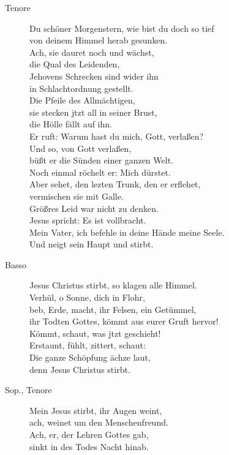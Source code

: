 \documentclass[parskip=full]{scrreprt}
\begin{document}
\begin{description}
  \item[Tenore]
  Du schöner Morgenstern, wie bist du doch so tief\\
  von deinem Himmel herab gesunken.\\
  Ach, sie dauret noch und wächst,\\
  die Qual des Leidenden,\\
  Jehovens Schrecken sind wider ihn\\
  in Schlachtordnung gestellt.\\
  Die Pfeile des Allmächtigen,\\
  sie stecken jtzt all in seiner Brust,\\
  die Hölle fällt auf ihn.\\
  Er ruft: Warum hast du mich, Gott, verlaßen?\\
  Und so, von Gott verlaßen,\\
  büßt er die Sünden einer ganzen Welt.\\
  Noch einmal röchelt er: Mich dürstet.\\
  Aber sehet, den lezten Trunk, den er erflehet,\\
  vermischen sie mit Galle.\\
  Größres Leid war nicht zu denken.\\
  Jesus spricht: Es ist vollbracht.\\
  Mein Vater, ich befehle in deine Hände meine Seele.\\
  Und neigt sein Haupt und stirbt.

  \item[Basso]
  Jesus Christus stirbt, so klagen alle Himmel.\\
  Verhül, o Sonne, dich in Flohr,\\
  beb, Erde, macht, ihr Felsen, ein Getümmel,\\
  ihr Todten Gottes, kömmt aus eurer Gruft hervor!\\
  Kömmt, schaut, was jtzt geschieht!\\
  Erstaunt, fühlt, zittert, schaut:\\
  Die ganze Schöpfung ächze laut,\\
  denn Jesus Christus stirbt.

  \item[Sop., Tenore]
  Mein Jesus stirbt, ihr Augen weint,\\
  ach, weinet um den Menschenfreund.\\
  Ach, er, der Lehren Gottes gab,\\
  sinkt in des Todes Nacht hinab.


\end{description}
\end{document}

